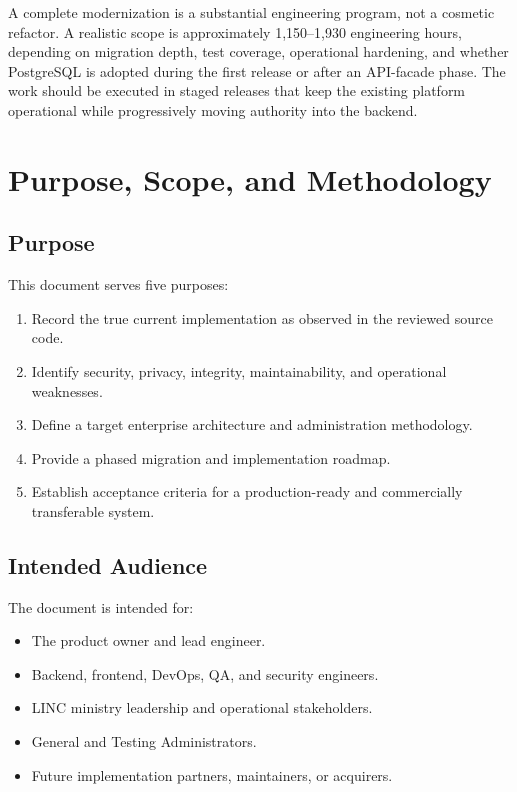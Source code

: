 \documentclass[11pt,a4paper,oneside]{report}
\begin{document}
A complete modernization is a substantial engineering program, not a cosmetic refactor. A realistic scope is approximately 1,150--1,930 engineering hours, depending on migration depth, test coverage, operational hardening, and whether PostgreSQL is adopted during the first release or after an API-facade phase. The work should be executed in staged releases that keep the existing platform operational while progressively moving authority into the backend.

\chapter{Purpose, Scope, and Methodology}

\section{Purpose}

This document serves five purposes:

\begin{enumerate}
  \item Record the true current implementation as observed in the reviewed source code.
  \item Identify security, privacy, integrity, maintainability, and operational weaknesses.
  \item Define a target enterprise architecture and administration methodology.
  \item Provide a phased migration and implementation roadmap.
  \item Establish acceptance criteria for a production-ready and commercially transferable system.
\end{enumerate}

\section{Intended Audience}

The document is intended for:

\begin{itemize}
  \item The product owner and lead engineer.
  \item Backend, frontend, DevOps, QA, and security engineers.
  \item LINC ministry leadership and operational stakeholders.
  \item General and Testing Administrators.
  \item Future implementation partners, maintainers, or acquirers.
\end{itemize}
\end{document}
